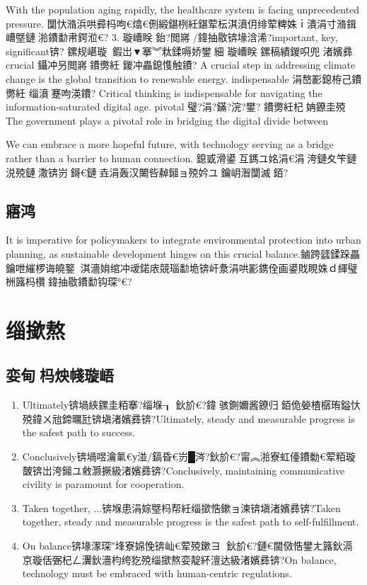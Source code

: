 ﻿\documentclass[lang=cn,11pt]{elegantbook}
\begin{document}
With the population aging rapidly, the healthcare system is facing unprecedented pressure.
闅忕潃浜哄彛杩呴€熻€侀緞鍖栵紝鍖荤枟淇濆仴绯荤粺姝ｉ潰涓寸潃鍓嶆墍鏈湁鐨勫帇鍔涖€?
3. 璇嶆眹
鈶?閲嶈/鍏抽敭锛堟浛浠?important, key, significant锛?
鏍规嵁璇鍜岀▼搴︾粏鍒嗕娇鐢細
璇嶆眹 鏍稿績鍐呮兜 渚嬪彞
crucial 鑷冲叧閲嶈鐨勶紝
鍐冲畾鎴愯触鐨?
A crucial step in addressing climate change is the global transition to renewable
energy.
indispensable 涓嶅彲鎴栫己鐨勶紝
缁濆蹇呴渶鐨?
Critical thinking is indispensable for navigating the information-saturated
digital age.
pivotal 璧?涓?鏋?浣?鐢?
鐨勶紝杞姌鐐圭殑
The government plays a pivotal role in bridging the digital divide between

We can embrace a more hopeful future, with technology serving as a bridge rather than a barrier to human connection.
鎴戜滑鍙互鎷ユ姳涓€涓洿鏈夊笇鏈涚殑鏈潵锛岃鎶€鏈垚涓轰汉闄呰繛鎺ョ殑妗ユ鑰岄潪闅滅銆?

\subsection{寤鸿}
It is imperative for policymakers to integrate environmental protection into urban planning, as sustainable development hinges on this crucial balance.鏀跨瓥鍒跺畾鑰呭繀椤诲皢鐜淇濇姢绾冲叆鍩庡競瑙勫垝锛屽洜涓哄彲鎸佺画鍙戝睍姝ｄ緷璧栦簬杩欑鍏抽敭鐨勫钩琛°€?

\section{缁撳熬}
\subsection{娈甸杩炴帴璇峿}
\begin{enumerate}
\item Ultimately锛堝綊鏍圭粨搴?缁堢┒ 鈥斺€?鍏骇鍘嬭酱鐐归銆佹嫈楂樼珛鎰忕殑鍏ㄨ兘鍗曞瓧锛塡渚嬪彞锛?Ultimately, steady and measurable progress is the safest path to success.
\item Conclusively锛堝喅瀹氭€у湴/鎬昏€岃█涔?鈥斺€?甯︽湁寮虹儓鐨勬€荤粨璇皵锛岀洿鎺ユ敹灏撅級渚嬪彞锛?Conclusively, maintaining communicative civility is paramount for cooperation.
\item Taken together, ...锛堢患涓婃墍杩帮紝缁撳悎鏉ョ湅锛塡渚嬪彞锛?Taken together, steady and measurable progress is the safest path to self-fulfillment.
\item On balance锛堟潈琛″埄寮婂悗锛屾€荤殑鏉ヨ 鈥斺€?鏈€閫傚悎鐢ㄤ簬鈥滆京璇佸弻杞ㄥ瀷鈥濇枃绔犵殑缁撳熬娈靛紑澶达級渚嬪彞锛?On balance, technology must be embraced with human-centric regulations.
\end{enumerate}
\end{document}
